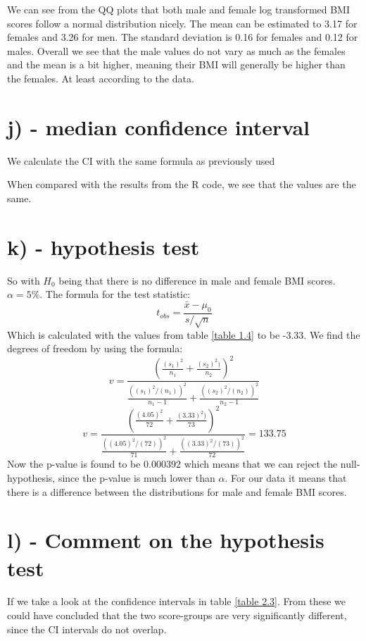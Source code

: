 \documentclass{memoir}
\begin{document}
We can see from the QQ plots that both male and female log transformed BMI scores follow a normal distribution nicely. The mean can be estimated to 3.17 for females and 3.26 for men. The standard deviation is 0.16 for females and 0.12 for males. 
Overall we see that the male values do not vary as much as the females and the mean is a bit higher, meaning their BMI will generally be higher than the females. At least according to the data.
\section{j) - median confidence interval }
We calculate the CI with the same formula as previously used
\begin{table}[]
\centering
\caption{Calculated median BMI CI}
\label{table 2.3}
\end{table}
When compared with the results from the R code, we see that the values are the same. 
\section{k) - hypothesis test}
So with $H_0 $ being that there is no difference in male and female BMI scores. $\alpha = 5\%$. The formula for the test statistic: 
$$ t_{obs} = \frac{\bar{x}-\mu_{0}}{s / \sqrt{n}} $$
Which is calculated with the values from table \ref{table 1.4} to be -3.33. 
We find the degrees of freedom by using the formula: 
$$ v = \frac{(\frac{(s_1)^2}{n_1}+\frac{(s_2)^2)}{n_2})^2}{\frac{((s_1)^2/(n_1))^2}{n_1-1}+\frac{((s_2)^2/(n_2))^2}{n_2-1}}  $$
$$ v = \frac{(\frac{(4.05)^2}{72}+\frac{(3.33)^2)}{73})^2}{\frac{((4.05)^2/(72))^2}{71}+\frac{((3.33)^2/(73))^2}{72}} = 133.75 $$
Now the p-value is found to be 0.000392 which means that we can reject the null-hypothesis, since the p-value is much lower than $\alpha$. 
For our data it means that there is a difference between the distributions for male and female BMI scores.

\section{l) - Comment on the hypothesis test}
If we take a look at the confidence intervals in table \ref{table 2.3}. From these we could have concluded that the two score-groups are very significantly different, since the CI intervals do not overlap.
\end{document}
